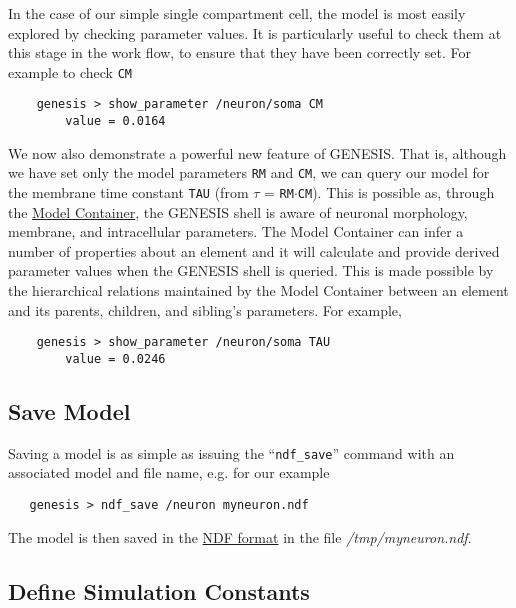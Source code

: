 \documentclass[12pt]{article}
\begin{document}
In the case of our simple single compartment cell, the model is most easily explored by checking parameter values. It is particularly useful to check them at this stage in the work flow, to ensure that they have been correctly set. For example to check {\tt CM}
\begin{verbatim}
    genesis > show_parameter /neuron/soma CM
        value = 0.0164
\end{verbatim}

We now also demonstrate a powerful new feature of GENESIS. That is, although we have set only the model parameters {\tt RM} and {\tt CM}, we can query our model for the membrane time constant {\tt TAU} (from $\tau$ = {\tt RM}$\cdot${\tt CM}). This is possible as, through the \href{../model-container/model-container.pdf}{Model Container}, the GENESIS shell is aware of neuronal morphology, membrane, and intracellular parameters. The Model Container can infer a number of properties about an element and it will calculate and provide derived parameter values when the GENESIS shell is queried. This is made possible by the hierarchical relations maintained by the Model Container between an element and its parents, children, and sibling's parameters. For example,
\begin{verbatim}
    genesis > show_parameter /neuron/soma TAU
        value = 0.0246
\end{verbatim}

\subsection*{Save Model}

Saving a model is as simple as issuing the ``{\tt ndf\_save}'' command with an associated model and file name, e.g. for our example
\begin{verbatim}
   genesis > ndf_save /neuron myneuron.ndf
\end{verbatim}
The model is then saved in the \href{../ndf-format/ndf-format.pdf}{NDF format} in the file {\it /tmp/myneuron.ndf}.

\subsection*{Define Simulation Constants}
\end{document}
